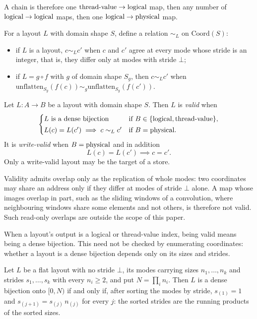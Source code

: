 A chain is therefore one $\textrm{thread-value} \to \textrm{logical}$ map, then any number of
$\textrm{logical} \to \textrm{logical}$ maps, then one $\textrm{logical} \to \textrm{physical}$ map.

\begin{definition}\label{def:replica}
For a layout $L$ with domain shape $S$, define a relation $\sim_L$ on
$\mathrm{Coord}(S)$:
\begin{itemize}
\item if $L$ is a layout, $c \sim_L c'$ when $c$ and $c'$ agree at every
mode whose stride is an integer, that is, they differ only at modes
with stride $\bot$;
\item if $L = g \circ f$ with $g$ of domain shape $S_g$, then $c \sim_L c'$ when
$\mathrm{unflatten}_{S_g}(f(c)) \sim_g \mathrm{unflatten}_{S_g}(f(c'))$.
\end{itemize}
\end{definition}

\begin{definition}[Validity]\label{def:validity}\label{sec:validity}
Let $L : A \to B$ be a layout with domain shape $S$. Then $L$ is \emph{valid}
when
\[
\begin{cases}
L \text{ is a dense bijection}
  & \text{if } B \in \{\textrm{logical}, \textrm{thread-value}\},\\[2pt]
L(c) = L(c') \implies c \sim_L c'
  & \text{if } B = \textrm{physical}.
\end{cases}
\]
It is \emph{write-valid} when $B = \textrm{physical}$ and in addition
\[
L(c) = L(c') \implies c = c'.
\]
Only a write-valid layout may be the target of a store.
\end{definition}

Validity admits overlap only as the replication of whole modes: two
coordinates may share an address only if they differ at modes of stride
$\bot$ alone. A map whose images overlap in part, such as the sliding windows
of a convolution, where neighbouring windows share some elements and not
others, is therefore not valid. Such read-only overlaps are outside the scope
of this paper.

When a layout's output is a logical or thread-value index, being valid means
being a dense bijection. This need not be checked by enumerating coordinates:
whether a layout is a dense bijection depends only on its sizes and strides.

\begin{lemma}\label{lem:dense}
Let $L$ be a flat layout with no stride $\bot$, its modes carrying sizes
$n_1,\dots,n_k$ and strides $s_1,\dots,s_k$ with every $n_i \ge 2$, and put
$N = \prod_i n_i$. Then $L$ is a dense bijection onto $[0,N)$ if and only if,
after sorting the modes by stride, $s_{(1)} = 1$ and
$s_{(j+1)} = s_{(j)}\,n_{(j)}$ for every $j$: the sorted strides are the
running products of the sorted sizes.
\end{lemma}

